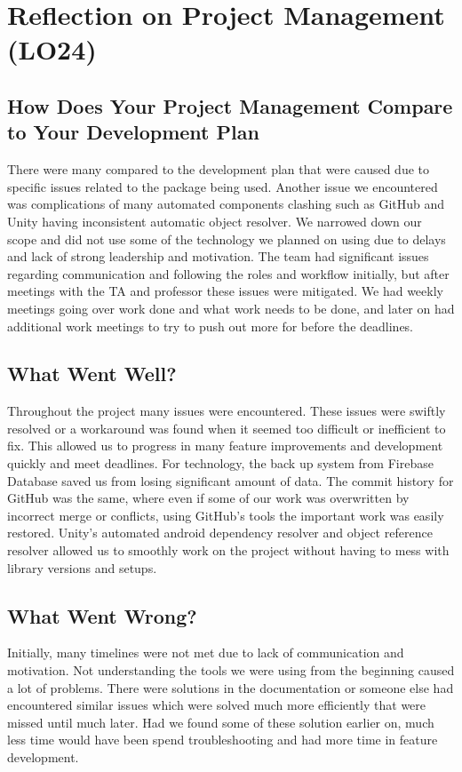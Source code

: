 \documentclass{article}
\begin{document}
\section{Reflection on Project Management (LO24)}
\subsection{How Does Your Project Management Compare to Your Development Plan}
There were many compared to the development plan that were caused due to specific issues related to the package being used. Another issue we encountered was complications of many automated components clashing such as GitHub and Unity having inconsistent automatic object resolver. We narrowed down our scope and did not use some of the technology we planned on using due to delays and lack of strong leadership and motivation. The team had significant issues regarding communication and following the roles and workflow initially, but after meetings with the TA and professor these issues were mitigated. We had weekly meetings going over work done and what work needs to be done, and later on had additional work meetings to try to push out more for before the deadlines. 

\subsection{What Went Well?}
Throughout the project many issues were encountered. These issues were swiftly resolved or a workaround was found when it seemed too difficult or inefficient to fix. This allowed us to progress in many feature improvements and development quickly and meet deadlines. For technology, the back up system from Firebase Database saved us from losing significant amount of data. The commit history for GitHub was the same, where even if some of our work was overwritten by incorrect merge or conflicts, using GitHub's tools the important work was easily restored. Unity's automated android dependency resolver and object reference resolver allowed us to smoothly work on the project without having to mess with library versions and setups. 

\subsection{What Went Wrong?}
Initially, many timelines were not met due to lack of communication and motivation. 
Not understanding the tools we were using from the beginning caused a lot of problems. There were solutions in the documentation or someone else had encountered similar issues which were solved much more efficiently that were missed until much later. Had we found some of these solution earlier on, much less time would have been spend troubleshooting and had more time in feature development.
\end{document}

